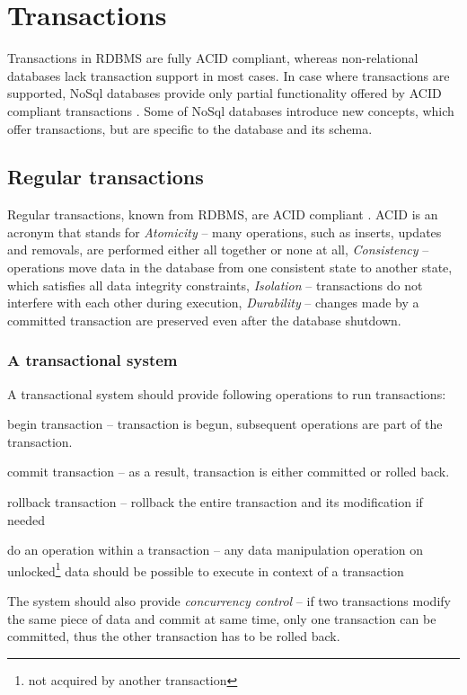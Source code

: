 \section{Transactions}\label{sec:theory:transactions}
Transactions in RDBMS are fully ACID compliant, whereas non-relational databases lack transaction support in most cases. 
In case where transactions are supported, NoSql databases provide only partial functionality offered by ACID compliant transactions \cite{StonebrakerSqlVsNosql}. 
Some of NoSql databases introduce new concepts, which offer transactions, but are specific to the database and its schema.


\subsection{Regular transactions}
Regular transactions, known from RDBMS, are ACID compliant \cite{ACID}. ACID is an acronym that stands for \emph{Atomicity} -- many operations, such as inserts, updates and removals, are performed either all together or none at all, \emph{Consistency} -- operations move data in the database from one consistent state to another state, which satisfies all data integrity constraints, \emph{Isolation} -- transactions do not interfere with each other during execution, \emph{Durability} -- changes made by a committed transaction are preserved even after the database shutdown.

\subsubsection{A transactional system}
A transactional system should provide following operations to run transactions:
\begin{enumerate*}[label=\alph*)]
\item begin transaction -- transaction is begun, subsequent operations are part of the transaction. 
\item commit transaction -- as a result, transaction is either committed or rolled back.
\item rollback transaction -- rollback the entire transaction and its modification if needed
\item do an operation within a transaction -- any data manipulation operation on unlocked\footnote{not acquired by another transaction} data should be possible to execute in context of a transaction
\end{enumerate*}

The system should also provide \emph{concurrency control} -- if two transactions modify the same piece of data and
commit at same time, only one transaction can be committed,
thus the other transaction has to be rolled back.


